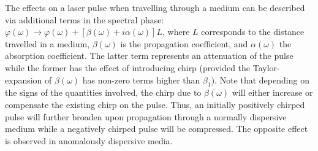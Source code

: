 \documentclass[a4paper]{jpconf}
\begin{document}
The effects on a laser pulse when travelling through a medium can be described via additional terms in the spectral phase: $\varphi(\omega) \to \varphi(\omega) + [\beta(\omega) + i \alpha(\omega)]L$, where $L$ corresponds to the distance travelled in a medium, $\beta(\omega)$ is the propagation coefficient, and $\alpha(\omega)$ the absorption coefficient. The latter term represents an attenuation of the pulse while the former has the effect of introducing chirp (provided the Taylor-expansion of $\beta(\omega)$ has non-zero terms higher than $\beta_1$). Note that depending on the signs of the quantities involved, the chirp due to $\beta(\omega)$ will either increase or compensate the existing chirp on the pulse. Thus, an initially positively chirped pulse will further broaden upon propagation through a normally dispersive medium while a negatively chirped pulse will be compressed. The opposite effect is observed in anomalously dispersive media.
\end{document}
